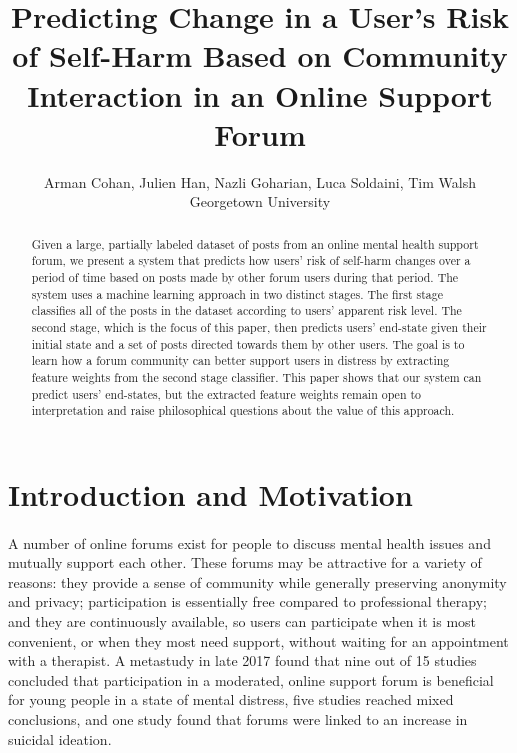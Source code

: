 \documentclass{article}
\begin{document}
\title{Predicting Change in a User's Risk of Self-Harm Based on Community Interaction in an Online Support Forum}
\author{
Arman Cohan, Julien Han, Nazli Goharian, Luca Soldaini, Tim Walsh\\
Georgetown University\\
}
\maketitle

\begin{abstract}
Given a large, partially labeled dataset of posts from an online mental health support forum, we present a system that predicts how users' risk of self-harm changes over a period of time based on posts made by other forum users during that period. The system uses a machine learning approach in two distinct stages. The first stage classifies all of the posts in the dataset according to users' apparent risk level. The second stage, which is the focus of this paper, then predicts users' end-state given their initial state and a set of posts directed towards them by other users. The goal is to learn how a forum community can better support users in distress by extracting feature weights from the second stage classifier. This paper shows that our system can predict users' end-states, but the extracted feature weights remain open to interpretation and raise philosophical questions about the value of this approach.
\end{abstract}

\section{Introduction and Motivation}

\paragraph{}A number of online forums exist for people to discuss mental health issues and mutually support each other. These forums may be attractive for a variety of reasons: they provide a sense of community while generally preserving anonymity and privacy; participation is essentially free compared to professional therapy; and they are continuously available, so users can participate when it is most convenient, or when they most need support, without waiting for an appointment with a therapist. A metastudy in late 2017\cite{marchant} found that nine out of 15 studies concluded that participation in a moderated, online support forum is beneficial for young people in a state of mental distress, five studies reached mixed conclusions, and one study found that forums were linked to an increase in suicidal ideation\cite{dunlop}.
\end{document}
